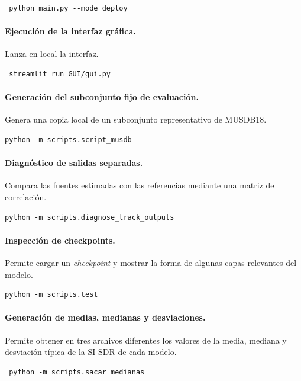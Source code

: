 \begin{verbatim} python main.py --mode deploy \end{verbatim}

\paragraph{Ejecución de la interfaz gráfica.} Lanza en local la interfaz.

\begin{verbatim} streamlit run GUI/gui.py \end{verbatim}

\paragraph{Generación del subconjunto fijo de evaluación.} Genera una copia local de un subconjunto representativo de MUSDB18.

\begin{verbatim}
python -m scripts.script_musdb
\end{verbatim}

\paragraph{Diagnóstico de salidas separadas.} Compara las fuentes estimadas con las referencias mediante una matriz de correlación.

\begin{verbatim}
python -m scripts.diagnose_track_outputs
\end{verbatim}

\paragraph{Inspección de checkpoints.} Permite cargar un \textit{checkpoint} y mostrar la forma de algunas capas relevantes del modelo.

\begin{verbatim}
python -m scripts.test
\end{verbatim}

\paragraph{Generación de medias, medianas y desviaciones.} Permite obtener en tres archivos diferentes los valores de la media, mediana y desviación típica de la SI-SDR de cada modelo.

\begin{verbatim} python -m scripts.sacar_medianas \end{verbatim}